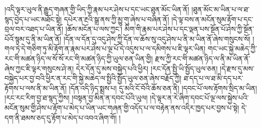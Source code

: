 །འདི་ལྟར་ཡུལ་ནི་རྒྱུད་གཞན་གྱི་ཡིད་ཀྱི་རྣམ་པར་ཤེས་པ་དང་ཡང་ཐུན་མོང་ཡིན་ནོ། །ཐུན་མོང་མ་ཡིན་པ་ལ་ཐ་སྙད་བྱེད་པ་ཡང་མཐོང་སྟེ། དཔེར་ན་རྔའི་སྒྲ་ནས་ཀྱི་མྱུ་གུ་ཞེས་པ་བཞིན་ནོ། །དེ་ལྟ་བས་ན་མངོན་སུམ་རྟོག་པ་དང་བྲལ་བར་འཐད་པ་ཡིན་ནོ། །ཆོས་མངོན་པ་ལས་ཀྱང་། མིག་གི་རྣམ་པར་ཤེས་པ་དང་ལྡན་པས་སྔོན་པོ་ཤེས་ཀྱི་སྔོན་པོའོ་སྙམ་དུ་ནི་མ་ཡིན་ནོ། །དོན་ལ་དོན་དུ་འདུ་ཤེས་ཀྱི་དོན་ལ་ཆོས་སུ་འདུ་ཤེས་པ་ནི་མ་ཡིན་ནོ་ཞེས་གསུངས་སོ། །གལ་ཏེ་དེ་གཅིག་ཏུ་མི་རྟོག་ན་རྣམ་པར་ཤེས་པ་ལྔ་པོ་དེ་འདུས་པ་ལ་དམིགས་པ་ཇི་ལྟར་ཡིན། གང་ཡང་སྐྱེ་མཆེད་ཀྱི་རང་གི་མཚན་ཉིད་ལ་སོ་སོ་རང་གི་མཚན་ཉིད་ཀྱི་ཡུལ་ཅན་ཡིན་གྱི། རྫས་ཀྱི་རང་གི་མཚན་ཉིད་ལ་ནི་མ་ཡིན་ནོ་ཞེས་ཀྱང་ཇི་ལྟར་གསུངས་ཤེ་ན། དེར་དོན་དུ་མས་བསྐྱེད་པའི་ཕྱིར། །རང་དོན་སྤྱི་ཡི་སྤྱོད་ཡུལ་ཅན། །དེ་རྫས་དུ་མས་བསྐྱེད་པར་བྱ་བའི་ཕྱིར་ན་རང་གི་སྐྱེ་མཆེད་ལ་སྤྱིའི་སྤྱོད་ཡུལ་ཅན་ཞེས་བརྗོད་ཀྱི། ཐ་དད་པ་ལ་ཐ་མི་དད་པར་རྟོགས་པ་ལས་ནི་མ་ཡིན་ནོ། །དོན་འདི་ཉིད་སྨྲས་པ། དུ་མའི་ངོ་བོའི་ཆོས་ཅན་ནི། །དབང་པོ་ལས་རྟོགས་སྲིད་མ་ཡིན། །རང་རང་རིག་བྱ་ཐ་སྙད་ཀྱིས། །བསྟན་བྱ་མིན་ན་དབང་པོའི་ཡུལ། །དེ་ལྟར་ན་རེ་ཞིག་དབང་པོ་ལྔ་ལས་སྐྱེས་པའི་མངོན་སུམ་གྱི་ཤེས་པ་རྟོག་པ་མེད་པ་ཡིན་ཡང་གཞན་གྱི་འདོད་པ་ལ་བརྟེན་ནས་འདིར་ཁྱད་པར་བྱས་པ་སྟེ། དེ་དག་ནི་ཐམས་ཅད་དུ་རྟོག་པ་མེད་པ་འབའ་ཞིག་གོ། །
